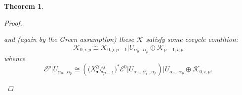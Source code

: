 \documentclass[11pt,fleqn]{article}
\theoremstyle{plain}
\newtheorem{theorem}{Theorem}[subsection]
\theoremstyle{definition}
\theoremstyle{remark}
\numberwithin{equation}{theorem}
\newcommand{\cover}{\mathcal{U}}
\newcommand{\restricted}{\mathbin{\big\vert}}
\newcommand{\nerve}[1]{X_{#1}^\cover}
\begin{document}
\begin{theorem}
\begin{proof}
\begin{enumerate}
                        and (again by the Gre{}en assumption) these $\mathcal{K}$ satisfy some cocycle condition:
                        \begin{equation}
                        \label{equation:cocycle-condition-on-the-K}
                            \mathcal{K}_{0,i,p}
                            \cong
                            \mathcal{K}_{0,j,p-1} \restricted U_{\alpha_0\ldots\alpha_p}
                            \oplus
                            \mathcal{K}_{p-1,i,p}
                        \end{equation}
                        whence
                        \begin{equation}
                        \label{equation:Ep-decomposed-into-Ep-1-as-E0-pullback}
                            \mathcal{E}^p \restricted U_{\alpha_0\ldots\alpha_p}
                            \cong
                            \left(
                                \big(\nerve{\bullet}\zeta_{p-1}^j\big)^* \mathcal{E}^0 \restricted U_{\alpha_0\ldots\widehat{\alpha_i}\ldots\alpha_p}
                            \right) \restricted U_{\alpha_0\ldots\alpha_p}
                            \oplus
                            \mathcal{K}_{0,i,p}.
                        \end{equation}


\end{enumerate}
\end{proof}
\end{theorem}
\end{document}

